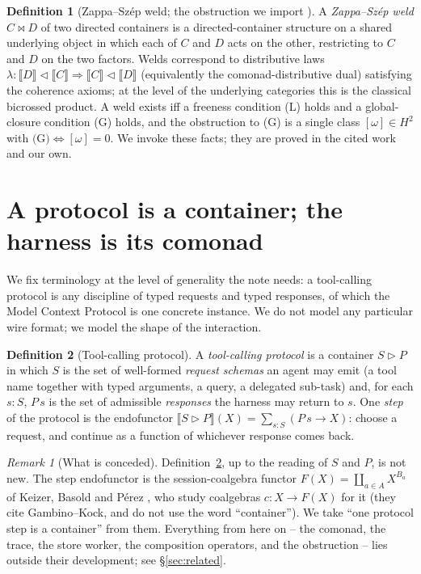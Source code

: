 \documentclass[11pt]{amsart}
\newcommand{\ctr}{\mathbin{\triangleright}}      %
\newcommand{\ext}[1]{\llbracket #1 \rrbracket}    %
\newcommand{\comp}{\mathbin{\triangleleft}}       %
\newcommand{\zs}{\bowtie}                          %
\theoremstyle{plain}
\theoremstyle{definition}
\newtheorem{definition}{Definition}
\theoremstyle{remark}
\newtheorem{remark}{Remark}
\begin{document}
\begin{definition}[Zappa--Sz\'ep weld; the obstruction we import \cite{ahmanuustaluDL}]\label{def:zs}
A \emph{Zappa--Sz\'ep weld} $C\zs D$ of two directed containers is a directed-container structure on
a shared underlying object in which each of $C$ and $D$ acts on the other, restricting to $C$ and $D$
on the two factors. Welds correspond to distributive laws
$\lambda:\ext D\comp\ext C\Rightarrow\ext C\comp\ext D$ (equivalently the comonad-distributive dual)
satisfying the coherence axioms; at the level of the underlying categories this is the classical
bicrossed product. A weld exists iff a freeness condition \textup{(L)} holds and a global-closure
condition \textup{(G)} holds, and the obstruction to \textup{(G)} is a single class $[\omega]\in H^2$
with $\text{(G)}\Leftrightarrow[\omega]=0$. We invoke these facts; they are proved in the cited work
and our own.
\end{definition}

\section{A protocol is a container; the harness is its comonad}\label{sec:protocol}

We fix terminology at the level of generality the note needs: a tool-calling protocol is any
discipline of typed requests and typed responses, of which the Model Context Protocol is one
concrete instance. We do not model any particular wire format; we model the shape of the interaction.

\begin{definition}[Tool-calling protocol]\label{def:protocol}
A \emph{tool-calling protocol} is a container $S\ctr P$ in which $S$ is the set of well-formed
\emph{request schemas} an agent may emit (a tool name together with typed arguments, a query, a
delegated sub-task) and, for each $s:S$, $P\,s$ is the set of admissible \emph{responses} the harness
may return to $s$. One \emph{step} of the protocol is the endofunctor $\ext{S\ctr P}(X)=\sum_{s:S}(P\,s\to
X)$: choose a request, and continue as a function of whichever response comes back.
\end{definition}

\begin{remark}[What is conceded]\label{rem:concede}
Definition~\ref{def:protocol}, up to the reading of $S$ and $P$, is not new. The step endofunctor is
the session-coalgebra functor $F(X)=\coprod_{a\in A}X^{B_a}$ of Keizer, Basold and P\'erez
\cite{sessioncoalg}, who study coalgebras $c:X\to F(X)$ for it (they cite Gambino--Kock, and do not
use the word ``container''). We take ``one protocol step is a container'' from them. Everything from
here on -- the comonad, the trace, the store worker, the composition operators, and the obstruction
-- lies outside their development; see \S\ref{sec:related}.
\end{remark}
\end{document}
